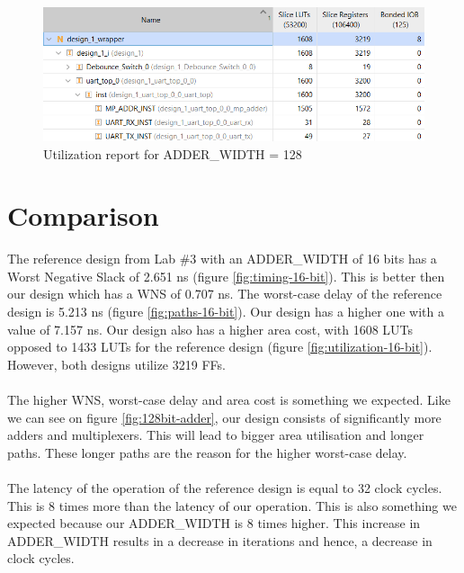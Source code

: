 \documentclass[a4paper,kul]{kulakarticle} %
\begin{document}
\begin{figure}[h]
	\centering
	\includegraphics[width=0.75\linewidth]{images/utilization-128-bit.png}
	\caption{Utilization report for ADDER\_WIDTH = 128}
	\label{fig:utilization-128-bit}
\end{figure}

\section{Comparison }


The reference design from Lab \#3 with an ADDER\_WIDTH of 16 bits has a Worst Negative Slack of 2.651 ns (figure \ref{fig:timing-16-bit}). This is better then our design which has a WNS of 0.707 ns. The worst-case delay of the reference design is 5.213 ns (figure \ref{fig:paths-16-bit}). Our design has a higher one with a value of 7.157 ns. Our design also has a higher area cost, with 1608 LUTs opposed to 1433 LUTs for the reference design (figure \ref{fig:utilization-16-bit}). However, both designs utilize 3219 FFs. 
\\\\
The higher WNS, worst-case delay and area cost is something we expected. Like we can see on figure \ref{fig:128bit-adder}, our design consists of significantly more adders and multiplexers. This will lead to bigger area utilisation and longer paths. These longer paths are the reason for the higher worst-case delay.
\\\\
The latency of the operation of the reference design is equal to 32 clock cycles. This is 8 times more than the latency of our operation. This is also something we expected because our ADDER\_WIDTH is 8 times higher. This increase in ADDER\_WIDTH results in a decrease in iterations and hence, a decrease in clock cycles.
\end{document}
